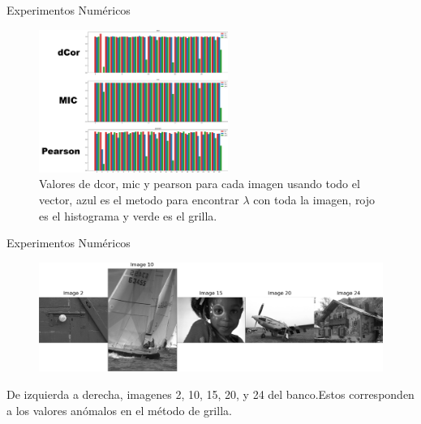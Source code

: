 \documentclass{beamer}
\begin{document}
\begin{frame}{Experimentos Numéricos}
    \begin{figure}[H]
        \centering
        \includegraphics[width=0.55\textwidth]{plot_comparison_full.png}
        \caption{Valores de dcor, mic y pearson para cada imagen usando todo el vector, azul es el metodo para encontrar $\lambda$ con toda la imagen, rojo es el histograma y verde es el grilla.}
    \end{figure}
\end{frame}

\begin{frame}{Experimentos Numéricos}
    \begin{figure}[H]
        \centering
        \includegraphics[width=\textwidth]{anomalies_grid.png}
    \end{figure}
    De izquierda a derecha, imagenes 2, 10, 15, 20, y 24 del banco.Estos corresponden a los valores an\'omalos en el m\'etodo de grilla.
\end{frame}
\end{document}
